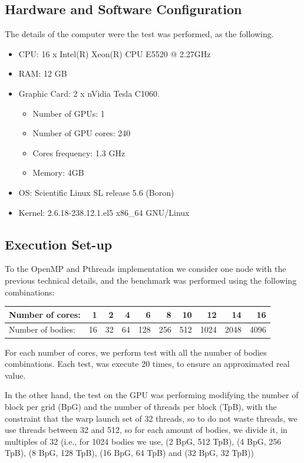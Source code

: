 \subsection{Hardware and Software Configuration}

The details of the computer were the test was performed,
as the following.

\begin{itemize}
	\item CPU: 16 x Intel(R) Xeon(R) CPU E5520  @ 2.27GHz
	\item RAM: 12 GB
	\item Graphic Card: 2 x nVidia Tesla C1060.
	\begin{itemize}
		\item Number of GPUs: 1
		\item Number of GPU cores: 240
		\item Cores frequency: 1.3 GHz
		\item Memory: 4GB
	\end{itemize}
	\item OS: Scientific Linux SL release 5.6 (Boron)
	\item Kernel: 2.6.18-238.12.1.el5 x86\_64 GNU/Linux
\end{itemize}

\subsection{Execution Set-up}

To the OpenMP and Pthreads implementation
we consider one node with the previous technical details,
and the benchmark was performed using the following combinations:

\begin{center}
\begin{tabular}{|l|r|r|r|r|r|r|r|r|r|}
	\hline
	Number of cores: & 1 & 2 & 4 & 6 & 8 & 10 & 12 & 14 & 16 \\
	\hline
	Number of bodies: & 16 & 32 & 64 & 128 & 256 & 512 & 1024 & 2048 & 4096 \\
	\hline
\end{tabular}
\end{center}

For each number of cores, we perform test with all the number of bodies combinations.
Each test, was execute 20 times, to ensure an approximated real value.

In the other hand,
the test on the GPU was performing modifying the number of block per grid (BpG)
and the number of threads per block (TpB), with the constraint
that the warp launch set of 32 threads, so to do not waste threads,
we use threads between 32 and 512, so for each amount of bodies,
we divide it, in multiples of 32 (i.e., for 1024 bodies we use,
(2 BpG, 512 TpB), (4 BpG, 256 TpB), (8 BpG, 128 TpB), (16 BpG, 64 TpB) and
(32 BpG, 32 TpB)) 

